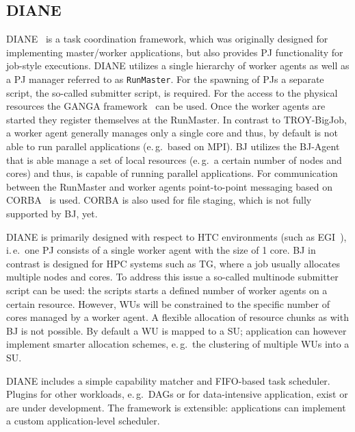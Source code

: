 \documentclass{sig-alternate}
\begin{document}
\subsection{DIANE}
DIANE~\cite{Moscicki:908910} is a task coordination framework, which
was originally designed for implementing master/worker applications,
but also provides PJ functionality for job-style executions. DIANE
utilizes a single hierarchy of worker agents as well as a PJ manager
referred to as \texttt{RunMaster}.
For the spawning of PJs a separate script, the so-called submitter script, is
required. For the access to the physical resources the GANGA
framework~\cite{Moscicki20092303} can be used.
Once the worker agents are started they register themselves at the RunMaster.
In contrast to TROY-BigJob, a worker agent generally manages only a single
core and thus, by default is not able to run parallel applications (e.\,g.\
based on MPI). BJ utilizes the BJ-Agent that is able manage a set of local
resources (e.\,g.\ a certain number of nodes and cores) and thus, is capable
of running parallel applications. For communication between the RunMaster and
worker agents point-to-point messaging based on CORBA~\cite{OMG-CORBA303:2004}
is used. CORBA is also used for file staging, which is not fully supported by
BJ, yet.

DIANE is primarily designed with respect to HTC environments (such as
EGI~\cite{egi}), i.\,e.\ one PJ consists of a single worker agent with the
size of 1 core. BJ in contrast is designed for HPC systems such as TG,
where a job usually allocates multiple nodes and cores. To address this issue
a so-called multinode submitter script can be used: the scripts starts a
defined number of worker agents on a certain resource. However, WUs will be
constrained to the specific number of cores managed by a worker agent. A
flexible allocation of resource chunks as with BJ is not possible. By
default a WU is mapped to a SU; application can however implement smarter
allocation schemes, e.\,g.\ the clustering of multiple WUs into a SU.

DIANE includes a simple capability matcher and FIFO-based task scheduler.
Plugins for other workloads, e.\,g.\ DAGs or for data-intensive
application, exist or are under development. The framework is extensible:
applications can implement a custom application-level scheduler.
\end{document}
